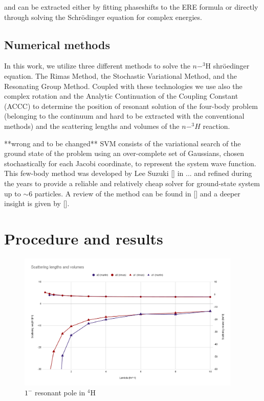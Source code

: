 \documentclass[aps,onecolumn,preprintnumbers,amsmath,amssymb,nofootinbib,superscriptaddress,notitlepage]{revtex4-1}
\begin{document}
and can be extracted either by fitting phaseshifts to the ERE formula or directly through solving the Schr\"odinger equation for complex energies. 




\subsection*{Numerical methods}

In this work, we utilize three different methods to solve the $n-^3$H shr\"oedinger equation.
The Rimas Method, the Stochastic Variational Method, and the Resonating Group Method. 
Coupled with these technologies we use also the complex rotation and the Analytic Continuation of the Coupling Constant (ACCC) to determine the position of resonant solution of the four-body problem (belonging to the continuum and hard to be extracted with the conventional methods) and the scattering lengths and volumes of the $n-^3H$ reaction. 

**wrong and to be changed** 
SVM consists of the variational search of the ground state of the problem using an over-complete set of Gaussians, chosen stochastically for each Jacobi coordinate, to represent the system wave function. 
This few-body method was developed by Lee Suzuki [] in ... and refined during the years to provide a reliable and relatively cheap solver for ground-state system up to $\sim 6$ particles.
A review of the method can be found in [] and a deeper insight is given by [].

%
%
%
%






%
%
%
%
%
%
%
%
%
%


\section{Procedure and results}

\begin{figure}
\centering
\includegraphics[width=0.95\textwidth]{./Graphs/a0a1} 
\caption{$1^-$ resonant pole in $^4$H}
\label{fig:a0a1}
\end{figure}
\end{document}
